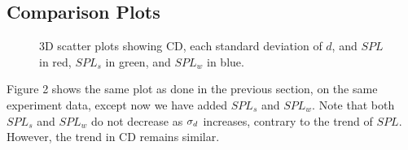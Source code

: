 \subsection{Comparison Plots}
\begin{figure}[hbt!]\centering
    \hfill

    \caption{3D scatter plots showing CD, each
    standard deviation of $d$, and $SPL$ in red,
    $SPL_s$ in green, and $SPL_w$ in blue.}
    \label{figure}
\end{figure}


Figure 2 shows the same plot as done in the previous section, on the
same experiment data, except now
we have added $SPL_s$ and $SPL_w$.
Note that both $SPL_s$ and $SPL_w$ do not decrease as $\sigma_d$ increases,
contrary to the trend of $SPL$.
However, the trend in CD remains similar.

